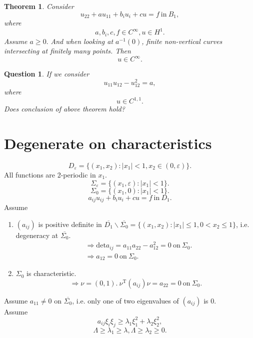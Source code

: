 \documentclass[12pt]{article}
\newtheorem{question}{Question}
\newtheorem{theorem}{Theorem}
\begin{document}
\begin{theorem}
Consider 
\[ u_{22} + au_{11} + b_iu_i + cu = f \mathrm{\ in\ }B_1, \]
where 
\[ a, b_i, c, f \in C^\infty, u\in H^1. \]
Assume $ a\ge 0. $ And when looking at $a^{-1}(0)$, finite non-vertical curves intersecting at finitely many points.
Then
\[ u\in C^\infty. \]
\end{theorem}

\begin{question}
If we consider
\[ u_{11}u_{12} - u_{12}^2 = a, \]
where
\[ u\in C^{1, 1}. \]
Does conclusion of above theorem hold?
\end{question}

\newpage
\section{Degenerate on characteristics}
\[ D_\varepsilon = \{ (x_1, x_2): |x_1|<1, x_2\in (0, \varepsilon) \}. \]
All functions are 2-periodic in $x_1$.
\[ \Sigma_\varepsilon = \{ (x_1, \varepsilon): |x_1|<1 \}. \]
\[ \Sigma_0 = \{ (x_1, 0): |x_1|<1 \}. \]
\[ a_{ij}u_{ij} + b_iu_i + cu = f \mathrm{\ in\ } D_1. \]
Assume
\begin{enumerate}
	\item $ (a_{ij})$ is positive definite in $\overline{D_1}\backslash \overline{\Sigma_0} = \{ (x_1, x_2):|x_1|\le 1, 0<x_2\le1 \}$, i.e. degeneracy at $\overline{\Sigma_0}$.
	\begin{align*}
	&\Rightarrow \mathrm{det}a_{ij} = a_{11}a_{22} - a_{12}^2 = 0\mathrm{\ on\ } \Sigma_0. \\
	& \Rightarrow a_{12} = 0 \mathrm{\ on\ }\Sigma_0. 
	\end{align*}
	\item $\Sigma_0$ is characteristic.
	\[ \Rightarrow \nu=(0, 1).\ \nu^\mathrm{T}(a_{ij})\nu = a_{22} = 0 \mathrm{\ on\ }\Sigma_0. \]
\end{enumerate}
Assume $a_{11}\ne0$ on $\overline{\Sigma_0}$, i.e. only one of two eigenvalues of $(a_{ij})$ is $0$.\\
Assume 
\[ a_{ij}\xi_i\xi_j \ge \lambda_1\xi_1^2 + \lambda_2\xi_2^2, \]
\[ \Lambda\ge\lambda_1\ge\lambda, \Lambda\ge\lambda_2\ge0. \]
\end{document}
